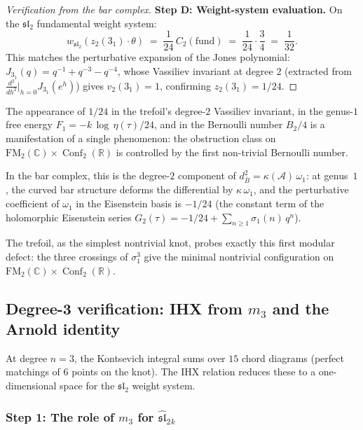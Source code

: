 \documentclass[11pt]{article}
\newcommand{\cA}{\mathcal{A}}
\newcommand{\fsl}{\mathfrak{sl}}
\newcommand{\barB}{\overline{B}}
\newcommand{\C}{\mathbb{C}}
\newcommand{\R}{\mathbb{R}}
\newcommand{\FM}{\mathrm{FM}}
\DeclareMathOperator{\Conf}{Conf}
\begin{document}
\begin{proof}[Verification from the bar complex]
\medskip
\noindent\textbf{Step D: Weight-system evaluation.}
On the $\fsl_2$ fundamental weight system:
\[
  w_{\fsl_2}(z_2(3_1) \cdot \theta)
  \;=\;
  \frac{1}{24}\,C_2(\mathrm{fund})
  \;=\;
  \frac{1}{24}\cdot\frac{3}{4}
  \;=\;
  \frac{1}{32}.
\]
This matches the perturbative expansion of the Jones polynomial:
$J_{3_1}(q) = q^{-1} + q^{-3} - q^{-4}$, whose Vassiliev
invariant at degree $2$ (extracted from
$\frac{d^2}{dh^2}\big|_{h=0} J_{3_1}(e^h)$) gives
$v_2(3_1) = 1$, confirming
$z_2(3_1) = 1/24$.
\end{proof}

\begin{remark}
\label{rem:1-24-dedekind}
The appearance of $1/24$ in the trefoil's degree-$2$
Vassiliev invariant, in the genus-$1$ free energy
$F_1 = -k\,\log\,\eta(\tau)/24$, and in the Bernoulli
number $B_2/4$ is a manifestation of a single phenomenon:
the obstruction class on $\FM_2(\C) \times \Conf_2(\R)$
is controlled by the first non-trivial Bernoulli number.

In the bar complex, this is the degree-$2$ component of
$d_{\barB}^2 = \kappa(\cA)\,\omega_1$: at genus~$1$, the
curved bar structure deforms the differential by $\kappa\,\omega_1$,
and the perturbative coefficient of $\omega_1$ in the Eisenstein
basis is $-1/24$ (the constant term of the holomorphic
Eisenstein series $G_2(\tau) = -1/24 + \sum_{n \ge 1}
\sigma_1(n)\,q^n$).

The trefoil, as the simplest nontrivial knot, probes exactly
this first modular defect: the three crossings of $\sigma_1^3$
give the minimal nontrivial configuration on
$\FM_2(\C) \times \Conf_2(\R)$.
\end{remark}

\subsection{Degree-3 verification: IHX from $m_3$ and the
Arnold identity}
\label{subsec:degree-3-trefoil}

At degree $n = 3$, the Kontsevich integral sums over $15$
chord diagrams (perfect matchings of $6$ points on the knot).
The IHX relation reduces these to a one-dimensional space for
the $\fsl_2$ weight system.

\subsubsection{Step 1: The role of $m_3$ for $\widehat{\fsl}_2{}_k$}
\end{document}
